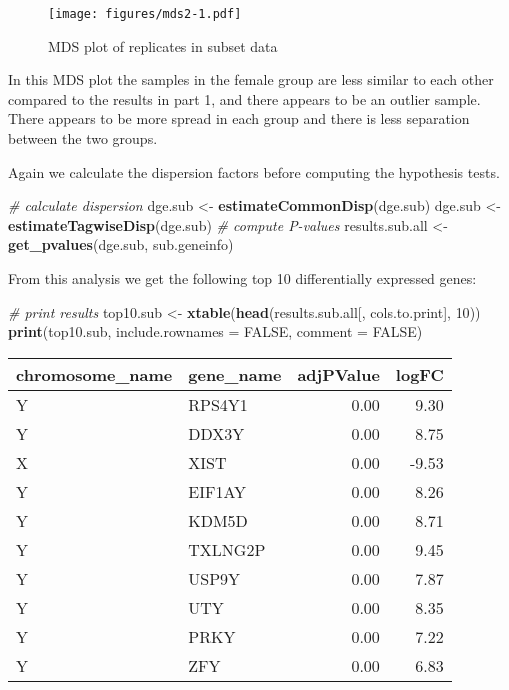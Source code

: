 \documentclass[]{article}
\newenvironment{Shaded}{\begin{snugshade}}{\end{snugshade}}
\newcommand{\KeywordTok}[1]{\textcolor[rgb]{0.13,0.29,0.53}{\textbf{{#1}}}}
\newcommand{\DataTypeTok}[1]{\textcolor[rgb]{0.13,0.29,0.53}{{#1}}}
\newcommand{\DecValTok}[1]{\textcolor[rgb]{0.00,0.00,0.81}{{#1}}}
\newcommand{\StringTok}[1]{\textcolor[rgb]{0.31,0.60,0.02}{{#1}}}
\newcommand{\CommentTok}[1]{\textcolor[rgb]{0.56,0.35,0.01}{\textit{{#1}}}}
\newcommand{\OtherTok}[1]{\textcolor[rgb]{0.56,0.35,0.01}{{#1}}}
\newcommand{\NormalTok}[1]{{#1}}
\begin{document}
\begin{figure}[htbp]
\centering
\texttt{[image: figures/mds2-1.pdf]}
\caption{MDS plot of replicates in subset data}
\end{figure}

In this MDS plot the samples in the female group are less similar to
each other compared to the results in part 1, and there appears to be an
outlier sample. There appears to be more spread in each group and there
is less separation between the two groups.

Again we calculate the dispersion factors before computing the
hypothesis tests.

\begin{Shaded}
\begin{Highlighting}[]
\CommentTok{# calculate dispersion}
\NormalTok{dge.sub <-}\StringTok{ }\KeywordTok{estimateCommonDisp}\NormalTok{(dge.sub)}
\NormalTok{dge.sub <-}\StringTok{ }\KeywordTok{estimateTagwiseDisp}\NormalTok{(dge.sub)}
\CommentTok{# compute P-values}
\NormalTok{results.sub.all <-}\StringTok{ }\KeywordTok{get_pvalues}\NormalTok{(dge.sub, sub.geneinfo)}
\end{Highlighting}
\end{Shaded}

From this analysis we get the following top 10 differentially expressed
genes:

\begin{Shaded}
\begin{Highlighting}[]
\CommentTok{# print results}
\NormalTok{top10.sub <-}\StringTok{ }\KeywordTok{xtable}\NormalTok{(}\KeywordTok{head}\NormalTok{(results.sub.all[, cols.to.print], }\DecValTok{10}\NormalTok{))}
\KeywordTok{print}\NormalTok{(top10.sub, }\DataTypeTok{include.rownames =} \OtherTok{FALSE}\NormalTok{, }\DataTypeTok{comment =} \OtherTok{FALSE}\NormalTok{)}
\end{Highlighting}
\end{Shaded}

\begin{table}[ht]
\centering
\begin{tabular}{llrr}
  \hline
chromosome\_name & gene\_name & adjPValue & logFC \\ 
  \hline
Y & RPS4Y1 & 0.00 & 9.30 \\ 
  Y & DDX3Y & 0.00 & 8.75 \\ 
  X & XIST & 0.00 & -9.53 \\ 
  Y & EIF1AY & 0.00 & 8.26 \\ 
  Y & KDM5D & 0.00 & 8.71 \\ 
  Y & TXLNG2P & 0.00 & 9.45 \\ 
  Y & USP9Y & 0.00 & 7.87 \\ 
  Y & UTY & 0.00 & 8.35 \\ 
  Y & PRKY & 0.00 & 7.22 \\ 
  Y & ZFY & 0.00 & 6.83 \\ 
   \hline
\end{tabular}
\end{table}
\end{document}
